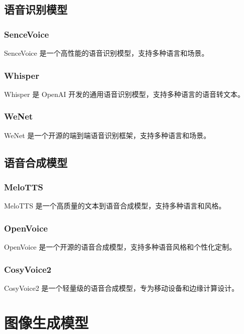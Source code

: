 \documentclass[12pt,UTF8]{ctexbook}
\begin{document}
\section{语音识别模型}

\subsection{SenceVoice}

SenceVoice 是一个高性能的语音识别模型，支持多种语言和场景。

\subsection{Whisper}

Whisper 是 OpenAI 开发的通用语音识别模型，支持多种语言的语音转文本。

\subsection{WeNet}

WeNet 是一个开源的端到端语音识别框架，支持多种语言和场景。

\section{语音合成模型}

\subsection{MeloTTS}

MeloTTS 是一个高质量的文本到语音合成模型，支持多种语言和风格。

\subsection{OpenVoice}

OpenVoice 是一个开源的语音合成模型，支持多种语音风格和个性化定制。

\subsection{CosyVoice2}

CosyVoice2 是一个轻量级的语音合成模型，专为移动设备和边缘计算设计。

\chapter{图像生成模型}
\end{document}
